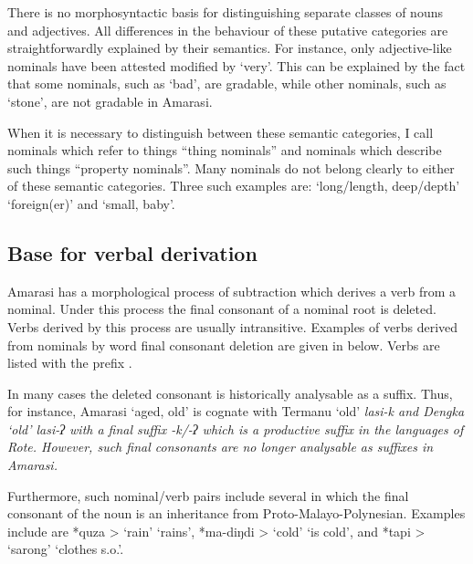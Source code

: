 There is no morphosyntactic basis for distinguishing
separate classes of nouns and adjectives.
All differences in the behaviour of these putative 
categories are straightforwardly explained by their semantics.
For instance, only adjective-like nominals have been attested modified by  `very'.
This can be explained by the fact that some
nominals, such as  `bad', are gradable,
while other nominals, such as  `stone', are not gradable in Amarasi.

When it is necessary to distinguish between these semantic categories,
I call nominals which refer to things ``thing nominals''
and nominals which describe such things ``property nominals''.
Many nominals do not belong clearly to either of these semantic categories.
Three such examples are:  `long/length, deep/depth'
 `foreign(er)' and  `small, baby'.

\subsection{Base for verbal derivation}\label{sec:BasVerDer}
Amarasi has a morphological process of subtraction which derives a verb from a nominal.
Under this process the final consonant of a nominal root is deleted.
Verbs derived by this process are usually intransitive.
Examples of verbs derived from nominals by word final consonant deletion
are given in  below.
Verbs are listed with the  prefix .

In many cases the deleted consonant is historically analysable as a suffix.
Thus, for instance, Amarasi  `aged, old'
is cognate with Termanu `old' \it{lasi-k} and Dengka `old' \it{lasi-ʔ}
with a final suffix \it{-k/-ʔ} which is
a productive suffix in the languages of Rote.
However, such final consonants are no longer
analysable as suffixes in Amarasi.

Furthermore, such nominal/verb pairs include several
in which the final consonant of the noun is an inheritance from Proto-Malayo-Polynesian.
Examples include are *quza >  `rain' {\ra}  `rains',
*ma-diŋdi >  `cold' {\ra}  `is cold',
and *tapi >  `sarong' {\ra}  `clothes s.o.'.

